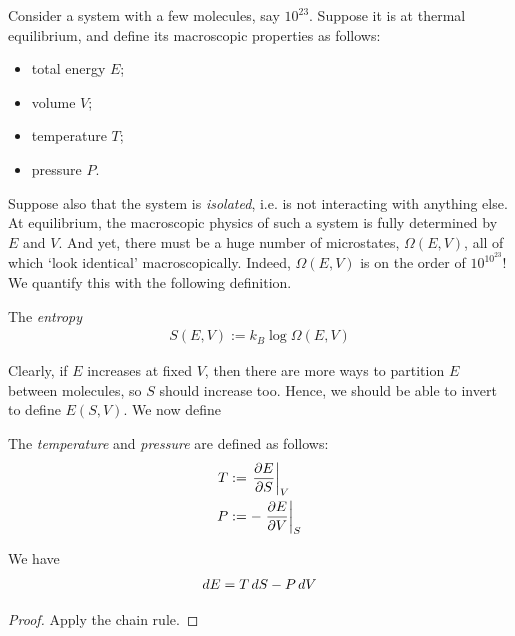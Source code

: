 \documentclass{../template/note}
\begin{document}
    Consider a system with a few molecules, say $10^{23}$. Suppose it is at thermal equilibrium, and define its macroscopic properties as follows:
    \begin{itemize}
        \item total energy $E$;
        \item volume $V$;
        \item temperature $T$;
        \item pressure $P$.
    \end{itemize}
    Suppose also that the system is \emph{isolated}, i.e. is not interacting with anything else. At equilibrium, the macroscopic physics of such a system is fully determined by $E$ and $V$. And yet, there must be a huge number of microstates, $\Omega(E, V)$, all of which `look identical' macroscopically. Indeed, $\Omega(E, V)$ is on the order of $10^{10^{23}}$! We quantify this with the following definition.

    \begin{definition}[Entropy]
        The \emph{entropy}
        \begin{align*}
            S(E, V) := k_B \log \Omega(E, V)
        \end{align*}
    \end{definition}
    
    Clearly, if $E$ increases at fixed $V$, then there are more ways to partition $E$ between molecules, so $S$ should increase too. Hence, we should be able to invert to define $E(S, V)$. We now define

    \begin{definition}
        \label{temp-pressure}
        The \emph{temperature} and \emph{pressure} are defined as follows:
        \begin{align*}
            T &:= \pd[V]{E}{S} \\
            P &:= -\pd[S]{E}{V}
        \end{align*}
    \end{definition}
    
    \begin{proposition}
        We have
        \begin{align*}
            dE = T \,d{S} - P \,d{V}
        \end{align*}        
    \end{proposition}
    
    \begin{proof}
        Apply the chain rule.
    \end{proof}
    
\end{document}
